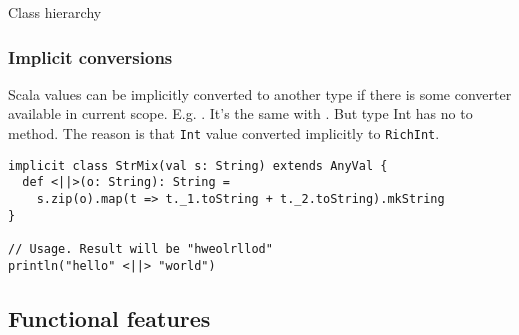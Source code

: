 \begin{frame}{Class hierarchy}


\end{frame}


\begin{frame}[fragile]
\frametitle{Implicit conversions}

Scala values can be implicitly converted to another type if there is some converter available in current scope. E.g.
. It's the same with . But type Int has no to method.
The reason is that \texttt{Int} value converted implicitly to \texttt{RichInt}.

\begin{example}
\begin{lstlisting}
implicit class StrMix(val s: String) extends AnyVal {
  def <||>(o: String): String =
    s.zip(o).map(t => t._1.toString + t._2.toString).mkString
}

// Usage. Result will be "hweolrllod"
println("hello" <||> "world")
\end{lstlisting}
\end{example}

\end{frame}

\subsection{Functional features}

